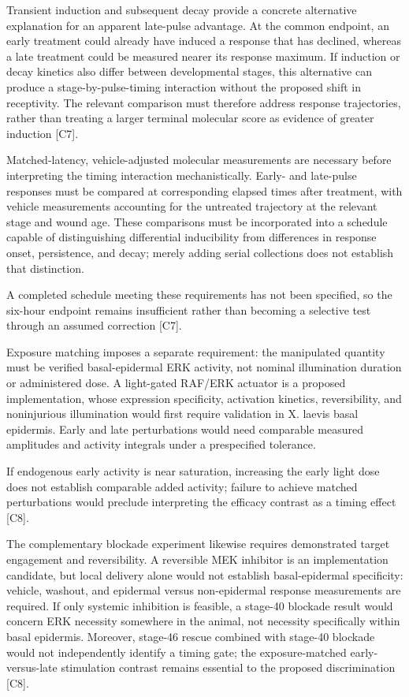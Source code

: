 \documentclass[11pt]{article}
\begin{document}
Transient induction and subsequent decay provide a concrete alternative explanation for an apparent late-pulse advantage. At the common endpoint, an early treatment could already have induced a response that has declined, whereas a late treatment could be measured nearer its response maximum. If induction or decay kinetics also differ between developmental stages, this alternative can produce a stage-by-pulse-timing interaction without the proposed shift in receptivity. The relevant comparison must therefore address response trajectories, rather than treating a larger terminal molecular score as evidence of greater induction [C7].

Matched-latency, vehicle-adjusted molecular measurements are necessary before interpreting the timing interaction mechanistically. Early- and late-pulse responses must be compared at corresponding elapsed times after treatment, with vehicle measurements accounting for the untreated trajectory at the relevant stage and wound age. These comparisons must be incorporated into a schedule capable of distinguishing differential inducibility from differences in response onset, persistence, and decay; merely adding serial collections does not establish that distinction.

A completed schedule meeting these requirements has not been specified, so the six-hour endpoint remains insufficient rather than becoming a selective test through an assumed correction [C7].

Exposure matching imposes a separate requirement: the manipulated quantity must be verified basal-epidermal ERK activity, not nominal illumination duration or administered dose. A light-gated RAF/ERK actuator is a proposed implementation, whose expression specificity, activation kinetics, reversibility, and noninjurious illumination would first require validation in X. laevis basal epidermis. Early and late perturbations would need comparable measured amplitudes and activity integrals under a prespecified tolerance.

If endogenous early activity is near saturation, increasing the early light dose does not establish comparable added activity; failure to achieve matched perturbations would preclude interpreting the efficacy contrast as a timing effect [C8].

The complementary blockade experiment likewise requires demonstrated target engagement and reversibility. A reversible MEK inhibitor is an implementation candidate, but local delivery alone would not establish basal-epidermal specificity: vehicle, washout, and epidermal versus non-epidermal response measurements are required. If only systemic inhibition is feasible, a stage-40 blockade result would concern ERK necessity somewhere in the animal, not necessity specifically within basal epidermis. Moreover, stage-46 rescue combined with stage-40 blockade would not independently identify a timing gate; the exposure-matched early-versus-late stimulation contrast remains essential to the proposed discrimination [C8].
\end{document}
